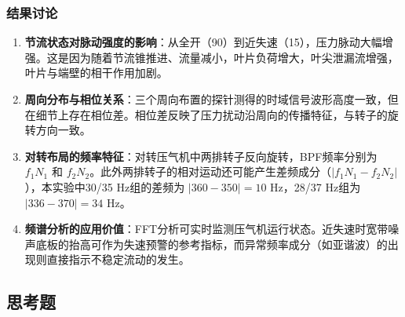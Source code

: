\subsubsection{结果讨论}

\begin{enumerate}
    \item \textbf{节流状态对脉动强度的影响}：从全开（90\textdegree{}）到近失速（15\textdegree{}），压力脉动大幅增强。这是因为随着节流锥推进、流量减小，叶片负荷增大，叶尖泄漏流增强，叶片与端壁的相干作用加剧。
    \item \textbf{周向分布与相位关系}：三个周向布置的探针测得的时域信号波形高度一致，但在细节上存在相位差。相位差反映了压力扰动沿周向的传播特征，与转子的旋转方向一致。
    \item \textbf{对转布局的频率特征}：对转压气机中两排转子反向旋转，BPF频率分别为 $f_1 N_1$ 和 $f_2 N_2$。此外两排转子的相对运动还可能产生差频成分（$|f_1 N_1 - f_2 N_2|$），本实验中30/35 Hz组的差频为 $|360-350| = 10$ Hz，28/37 Hz组为 $|336-370| = 34$ Hz。
    \item \textbf{频谱分析的应用价值}：FFT分析可实时监测压气机运行状态。近失速时宽带噪声底板的抬高可作为失速预警的参考指标，而异常频率成分（如亚谐波）的出现则直接指示不稳定流动的发生。
\end{enumerate}

\subsection{思考题}

